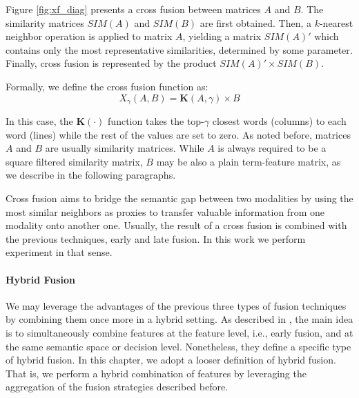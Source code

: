 Figure \ref{fig:xf_diag} presents a cross fusion between matrices $A$ and $B$. The similarity matrices $SIM(A)$ and $SIM(B)$ are first obtained. Then, a  $k$-nearest neighbor operation is applied to matrix $A$, yielding a matrix $SIM(A)'$ which contains only the most representative similarities, determined by some parameter. Finally, cross fusion is represented by the product $SIM(A)' \times SIM(B)$.

Formally, we define the cross fusion function as:
\begin{equation}\label{eq:xfusion}
X_{\gamma}(A,B) = \mathbf{K}(A,\gamma) \times B
\end{equation}

In this case, the $\mathbf{K}(\cdot)$ function takes the top-$\gamma$ closest words (columns) to each word (lines) while the rest of the values are set to zero. As noted before, matrices $A$ and $B$ are usually similarity matrices. While $A$ is always required to be a square filtered similarity matrix, $B$ may be also a plain term-feature matrix, as we describe in the following paragraphs.

Cross fusion aims to bridge the semantic gap between two modalities by using the most similar neighbors as proxies to transfer valuable information  from one modality onto another one. Usually, the result of a cross fusion is combined with the previous techniques, early and late fusion. In this work we perform  experiment in that sense.

\paragraph{Hybrid Fusion}
We may leverage the advantages of the previous three types of fusion techniques by combining them once more in a hybrid setting. As described in \cite{AtreyHEK10,yu2014informedia}, the main idea is to simultaneously combine features at the feature level, i.e., early fusion, and at the same semantic space or decision level. Nonetheless, they define a specific type of hybrid fusion. In this chapter, we adopt a looser definition of hybrid fusion. That is, we perform a hybrid combination of features by leveraging the aggregation of the fusion strategies described before. 

